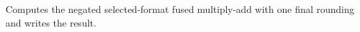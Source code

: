 Computes the negated selected-format fused multiply-add with one final rounding and writes the result.
